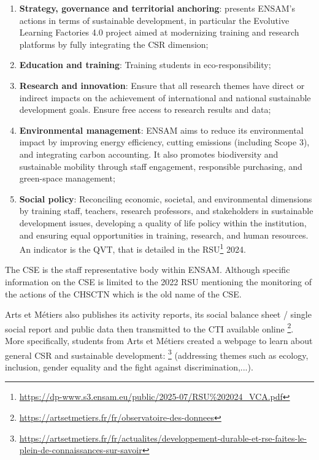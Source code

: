 \begin{enumerate}
    \item \textbf{Strategy, governance and territorial anchoring}: presents ENSAM's actions in terms of sustainable development, in particular the Evolutive Learning Factories 4.0 project aimed at modernizing training and research platforms by fully integrating the CSR dimension;
    \item \textbf{Education and training}: Training students in eco-responsibility;
    \item \textbf{Research and innovation}: Ensure that all research themes have direct or indirect impacts on the achievement of international and national sustainable development goals. Ensure free access to research results and data;
    \item \textbf{Environmental management}: ENSAM aims to reduce its environmental impact by improving energy efficiency, cutting emissions (including Scope 3), and integrating carbon accounting. It also promotes biodiversity and sustainable mobility through staff engagement, responsible purchasing, and green-space management;
    \item \textbf{Social policy}: Reconciling economic, societal, and environmental dimensions by training staff, teachers, research professors, and stakeholders in sustainable development issues, developing a quality of life policy within the institution, and ensuring equal opportunities in training, research, and human resources. An indicator is the \ac{QVT}, that is detailed in the \ac{RSU}\footnote{\url{https://dp-www.s3.ensam.eu/public/2025-07/RSU\%202024_VCA.pdf}} 2024.
\end{enumerate}

The \ac{CSE} is the staff representative body within ENSAM. Although specific information on the CSE is limited to the 2022 RSU mentioning the monitoring of the actions of the \ac{CHSCTN} which is the old name of the CSE.

Arts et Métiers also publishes its activity reports, its social balance sheet / single social report and public data then transmitted to the \ac{CTI} available online \footnote{\url{https://artsetmetiers.fr/fr/observatoire-des-donnees}}.
More specifically, students from Arts et Métiers created a webpage to learn about general CSR and sustainable development: \footnote{\url{https://artsetmetiers.fr/fr/actualites/developpement-durable-et-rse-faites-le-plein-de-connaissances-sur-savoir}} (addressing themes such as ecology, inclusion, gender equality and the fight against discrimination,...).




